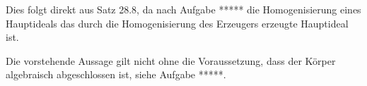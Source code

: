 {


\faktsituation {}



\faktzusatz {}

\faktzusatz {}


}

{


Dies folgt direkt aus
Satz 28.8,
da
nach Aufgabe *****
die Homogenisierung eines Hauptideals das durch die Homogenisierung des Erzeugers erzeugte Hauptideal ist.


}


Die vorstehende Aussage gilt nicht ohne die Voraussetzung, dass der Körper algebraisch abgeschlossen ist, siehe
Aufgabe *****.



